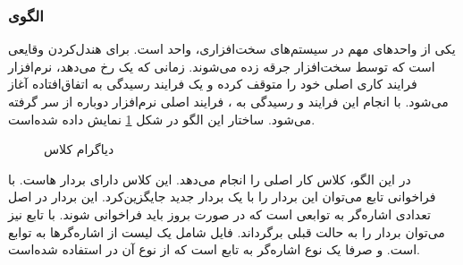 \subsubsection{الگوی }
\label{HWInterruptSec}
\begin{RTL}
یکی از واحدهای مهم در سیستم‌های سخت‌افزاری، واحد  است.
 برای هندل‌کردن وقایعی است که توسط سخت‌افزار جرقه زده می‌شوند.
زمانی که یک  رخ می‌دهد، نرم‌افزار فرایند کاری اصلی خود را متوقف
کرده و یک فرایند رسیدگی به  اتفاق‌افتاده آغاز می‌شود. با انجام
این فرایند و رسیدگی به ، فرایند اصلی نرم‌افزار دوباره از سر گرفته
می‌شود. ساختار این الگو در شکل \ref{HWInterruptClassDiag}
نمایش داده شده‌است.
\end{RTL}
\begin{figure}[h!]
\centering
{}
\caption{دیاگرام کلاس }
\label{HWInterruptClassDiag}
\end{figure}
\begin{RTL}
در این الگو، کلاس  کار اصلی را انجام می‌دهد.
این کلاس دارای بردار هاست.
با فراخوانی تابع  می‌توان این بردار را با یک بردار جدید جایگزین‌کرد.
این بردار در اصل تعدادی اشاره‌گر به توابعی است که در صورت بروز 
باید فراخوانی شوند. با تابع  نیز می‌توان بردار را به حالت قبلی
برگرداند. فایل  شامل یک لیست از
اشاره‌گرها به توابع  است.
و  صرفا یک نوع اشاره‌گر به تابع است که از نوع آن در
 استفاده شده‌است.
\end{RTL}